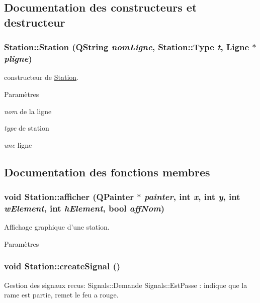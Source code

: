 \subsection{Documentation des constructeurs et destructeur}
\hypertarget{classStation_a3f359a7bed774082d2f1b5927ce4dd5c}{
\subsubsection[{Station}]{\setlength{\rightskip}{0pt plus 5cm}Station::Station (QString {\em nomLigne}, \/  Station::Type {\em t}, \/  {\bf Ligne} $\ast$ {\em pligne})}}
\label{classStation_a3f359a7bed774082d2f1b5927ce4dd5c}


constructeur de \hyperlink{classStation}{Station}. 


\begin{DoxyParams}{Paramètres}
\item[{\em nom}]de la ligne \item[{\em type}]de station \item[{\em une}]ligne \end{DoxyParams}


\subsection{Documentation des fonctions membres}
\hypertarget{classStation_aa4918eec32fe4f3484f629564b84e160}{
\subsubsection[{afficher}]{\setlength{\rightskip}{0pt plus 5cm}void Station::afficher (QPainter $\ast$ {\em painter}, \/  int {\em x}, \/  int {\em y}, \/  int {\em wElement}, \/  int {\em hElement}, \/  bool {\em affNom})}}
\label{classStation_aa4918eec32fe4f3484f629564b84e160}


Affichage graphique d'une station. 


\begin{DoxyParams}{Paramètres}
\item[{\em }]\end{DoxyParams}
\hypertarget{classStation_a41ad1728246bbecd645a7a9679a2e59c}{
\subsubsection[{createSignal}]{\setlength{\rightskip}{0pt plus 5cm}void Station::createSignal ()}}
\label{classStation_a41ad1728246bbecd645a7a9679a2e59c}
Gestion des signaux recus: Signals::Demande Signals::EstPasse : indique que la rame est partie, remet le feu a rouge. 


